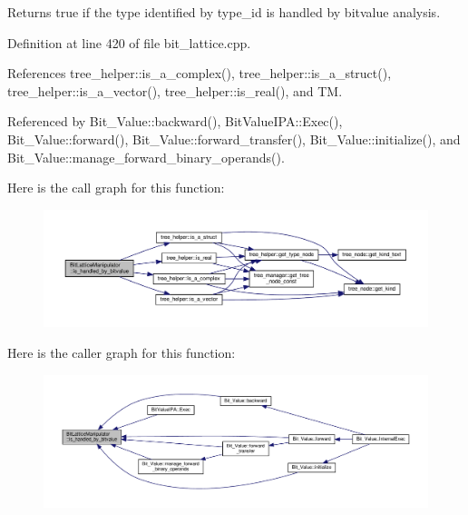 Returns true if the type identified by type\+\_\+id is handled by bitvalue analysis. 



Definition at line 420 of file bit\+\_\+lattice.\+cpp.



References tree\+\_\+helper\+::is\+\_\+a\+\_\+complex(), tree\+\_\+helper\+::is\+\_\+a\+\_\+struct(), tree\+\_\+helper\+::is\+\_\+a\+\_\+vector(), tree\+\_\+helper\+::is\+\_\+real(), and TM.



Referenced by Bit\+\_\+\+Value\+::backward(), Bit\+Value\+I\+P\+A\+::\+Exec(), Bit\+\_\+\+Value\+::forward(), Bit\+\_\+\+Value\+::forward\+\_\+transfer(), Bit\+\_\+\+Value\+::initialize(), and Bit\+\_\+\+Value\+::manage\+\_\+forward\+\_\+binary\+\_\+operands().

Here is the call graph for this function\+:
\nopagebreak
\begin{figure}[H]
\begin{center}
\leavevmode
\includegraphics[width=350pt]{dd/d98/classBitLatticeManipulator_ad148175c9bd6d44c0e75a6af94deedc8_cgraph}
\end{center}
\end{figure}
Here is the caller graph for this function\+:
\nopagebreak
\begin{figure}[H]
\begin{center}
\leavevmode
\includegraphics[width=350pt]{dd/d98/classBitLatticeManipulator_ad148175c9bd6d44c0e75a6af94deedc8_icgraph}
\end{center}
\end{figure}
\mbox{\label{classBitLatticeManipulator_a0834f7ec7dd8449fae5bdb6c60619956}} 
